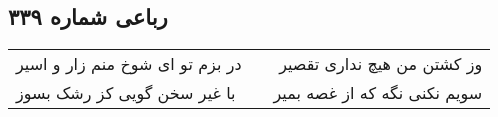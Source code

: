 \begin{center}
\section*{رباعی شماره ۳۳۹}
\label{sec:sh339}
\begin{longtable}{l p{0.5cm} r}
در بزم تو ای شوخ منم زار و اسیر
&&
وز کشتن من هیچ نداری تقصیر
\\
با غیر سخن گویی کز رشک بسوز
&&
سویم نکنی نگه که از غصه بمیر
\\
\end{longtable}
\end{center}
